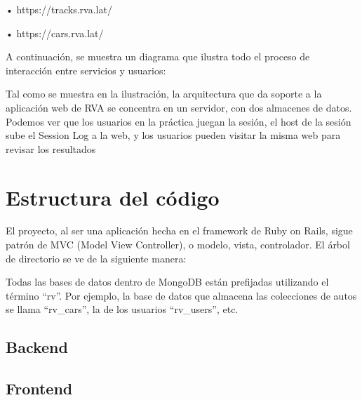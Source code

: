 •	https://tracks.rva.lat/

•	https://cars.rva.lat/

A continuación, se muestra un diagrama que ilustra todo el proceso de interacción entre servicios y usuarios:


Tal como se muestra en la ilustración, la arquitectura que da soporte a la aplicación web de RVA se concentra en un servidor, con dos almacenes de datos. Podemos ver que los usuarios en la práctica juegan la sesión, el host de la sesión sube el Session Log a la web, y los usuarios pueden visitar la misma web para revisar los resultados

\section{Estructura del código}
El proyecto, al ser una aplicación hecha en el framework de Ruby on Rails, sigue patrón de MVC (Model View Controller), o modelo, vista, controlador. El árbol de directorio se ve de la siguiente manera:


Todas las bases de datos dentro de MongoDB están prefijadas utilizando el término “rv”. Por ejemplo, la base de datos que almacena las colecciones de autos se llama “rv\_cars”, la de los usuarios “rv\_users”, etc.

\subsection{Backend}


\subsection{Frontend}


